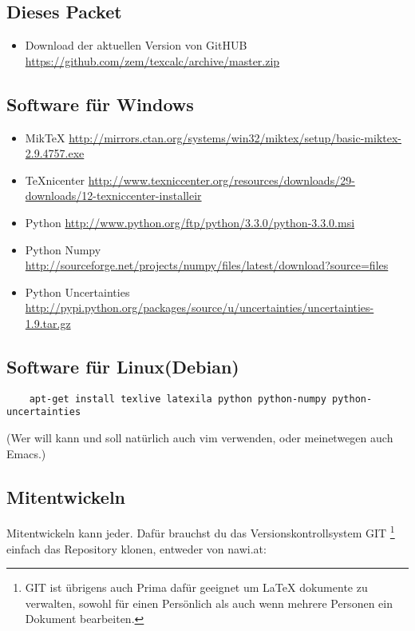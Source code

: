 \documentclass[a4paper]{article}
\begin{document}
\subsection{Dieses Packet}

\begin{itemize}
	\item Download der aktuellen Version von GitHUB \url{https://github.com/zem/texcalc/archive/master.zip}
\end{itemize}

\subsection{Software für Windows}

\begin{itemize}
	\item MikTeX \url{http://mirrors.ctan.org/systems/win32/miktex/setup/basic-miktex-2.9.4757.exe}
	\item TeXnicenter \url{http://www.texniccenter.org/resources/downloads/29-downloads/12-texniccenter-installeir}
	\item Python \url{http://www.python.org/ftp/python/3.3.0/python-3.3.0.msi}
	\item Python Numpy \url{http://sourceforge.net/projects/numpy/files/latest/download?source=files}
	\item Python Uncertainties \url{http://pypi.python.org/packages/source/u/uncertainties/uncertainties-1.9.tar.gz}
\end{itemize}

\subsection{Software für Linux(Debian)}

\begin{verbatim}
	apt-get install texlive latexila python python-numpy python-uncertainties
\end{verbatim}

(Wer will kann und soll natürlich auch vim verwenden, oder meinetwegen auch Emacs.)

\subsection{Mitentwickeln}

Mitentwickeln kann jeder. Dafür brauchst du das Versionskontrollsystem GIT
\footnote{GIT ist übrigens auch Prima dafür geeignet um LaTeX dokumente zu verwalten, 
sowohl für einen Persönlich als auch wenn mehrere Personen ein Dokument bearbeiten. } 
einfach das Repository klonen, entweder von nawi.at: 
\end{document}
